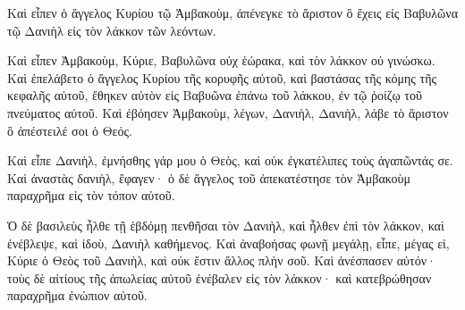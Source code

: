 {Καὶ εἶπεν ὁ ἄγγελος Κυρίου τῷ Ἀμβακοὺμ, ἀπένεγκε τὸ ἄριστον ὃ ἔχεις εἰς Βαβυλῶνα τῷ Δανιὴλ εἰς τὸν λάκκον τῶν λεόντων.
\par }{\PP {}Καὶ εἶπεν Ἀμβακοὺμ, Κύριε, Βαβυλῶνα οὐχ ἑώρακα, καὶ τὸν λάκκον οὐ γινώσκω.
Καὶ ἐπελάβετο ὁ ἄγγελος Κυρίου τῆς κορυφῆς αὐτοῦ, καὶ βαστάσας τῆς κόμης τῆς κεφαλῆς αὐτοῦ, ἔθηκεν αὐτὸν εἰς Βαβυῶνα ἐπάνω τοῦ λάκκου, ἐν τῷ ῥοίζῳ τοῦ πνεύματος αὐτοῦ.
Καὶ ἐβόησεν Ἀμβακοὺμ, λέγων, Δανιὴλ, Δανιὴλ, λάβε τὸ ἄριστον ὃ ἀπέστειλέ σοι ὁ Θεός.
\par }{\PP {}Καὶ εἶπε Δανιὴλ, ἐμνήσθης γάρ μου ὁ Θεὸς, καὶ οὐκ ἐγκατέλιπες τοὺς ἀγαπῶντάς σε.
Καὶ ἀναστὰς δανιὴλ, ἔφαγεν· ὁ δὲ ἄγγελος τοῦ ἀπεκατέστησε τὸν Ἀμβακοὺμ παραχρῆμα εἰς τὸν τόπον αὐτοῦ.
\par }{\PP {}Ὁ δὲ βασιλεὺς ἦλθε τῇ ἑβδόμῃ πενθῆσαι τὸν Δανιὴλ, καὶ ἦλθεν ἐπὶ τὸν λάκκον, καὶ ἐνέβλεψε, καὶ ἰδοὺ, Δανιὴλ καθήμενος.
Καὶ ἀναβοήσας φωνῇ μεγάλῃ, εἶπε, μέγας εἰ, Κύριε ὁ Θεὸς τοῦ Δανιὴλ, καὶ οὐκ ἔστιν ἄλλος πλὴν σοῦ.
Καὶ ἀνέσπασεν αὐτόν· τοὺς δὲ αἰτίους τῆς ἀπωλείας αὐτοῦ ἐνέβαλεν εἰς τὸν λάκκον· καὶ κατεβρώθησαν παραχρῆμα ἐνώπιον αὐτοῦ.
\par }